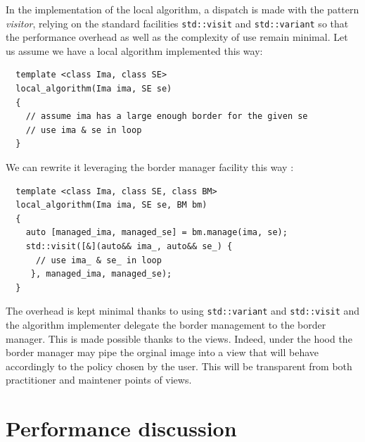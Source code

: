 In the implementation of the local algorithm, a dispatch is made with the pattern \emph{visitor}, relying on the
standard facilities \texttt{std::visit} and \texttt{std::variant} so that the performance overhead as well as the
complexity of use remain minimal. Let us assume we have a local algorithm implemented this way: 
\begin{verbatim}
  template <class Ima, class SE>
  local_algorithm(Ima ima, SE se)
  {
    // assume ima has a large enough border for the given se
    // use ima & se in loop
  }
\end{verbatim}
We can rewrite it leveraging the border manager facility this way :
\begin{verbatim}
  template <class Ima, class SE, class BM>
  local_algorithm(Ima ima, SE se, BM bm)
  {
    auto [managed_ima, managed_se] = bm.manage(ima, se);
    std::visit([&](auto&& ima_, auto&& se_) { 
      // use ima_ & se_ in loop
     }, managed_ima, managed_se);
  }
\end{verbatim}
The overhead is kept minimal thanks to using \texttt{std::variant} and \texttt{std::visit} and the algorithm implementer
delegate the border management to the border manager. This is made possible thanks to the views. Indeed, under the hood
the border manager may pipe the orginal image into a view that will behave accordingly to the policy chosen by the user.
This will be transparent from both practitioner and maintener points of views.

\section{Performance discussion}


